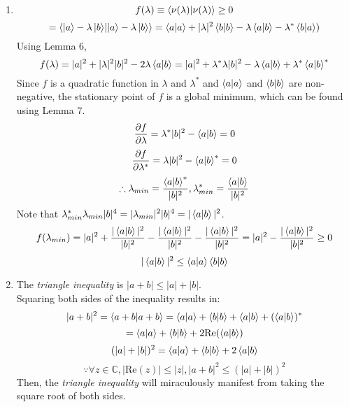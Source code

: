 \begin{sol}
\begin{enumerate}[label=\textbf{(\alph*)}]
\begin{proof}
$$\lim_{\epsilon\to 0} \frac{f(w+u\epsilon)-f(w)}{u\epsilon}=0$$ 
This limit is also the definition of $\displaystyle{\frac{\partial f}{\partial u}}$. 
\\
$$\text{Re}(z_0)\neq 0, \text{Im}(z_0)\neq 0\implies\forall z\in\mathbb{C}=\alpha z_0+\beta z_0^*, (\alpha,\beta)\in\mathbb{R}^2$$
$$\therefore\frac{\partial f}{\partial u}=\alpha\frac{\partial f}{\partial z_0}+\beta\frac{\partial f}{\partial z_0^*}=0$$ 
Define $w=u\epsilon$ and the defining condition for a stationary point of $f$ is satisfied. 
\end{proof}
\item
$$f(\lambda)\equiv\braket{\nu(\lambda)}{\nu(\lambda)}\geq 0$$
$$=\braket{\ket a-\lambda\ket b}{\ket a-\lambda\ket b}=\braket{a}{a}+|\lambda|^2\braket{b}{b}-\lambda\braket{a}{b}-\lambda^*\braket{b}{a})$$ 
Using Lemma 6, 
$$f(\lambda)=|a|^2+|\lambda|^2|b|^2-2\lambda\braket{a}{b}=|a|^2+\lambda^*\lambda|b|^2-\lambda\braket{a}{b}+\lambda^*\braket{a}{b}^*$$
Since $f$ is a quadratic function in $\lambda$ and $\lambda^*$ and $\braket{a}{a}$ and $\braket{b}{b}$ are non-negative, the stationary point of $f$ is a global minimum, which can be found using Lemma 7.
$$\frac{\partial f}{\partial\lambda}=\lambda^*|b|^2-\braket{a}{b}=0$$ 
$$\frac{\partial f}{\partial\lambda^*}=\lambda|b|^2-\braket{a}{b}^*=0$$ 
$$\therefore\lambda_{min}=\frac{\braket{a}{b}^*}{|b|^2},\lambda^*_{min}=\frac{\braket{a}{b}}{|b|^2}$$
Note that $\lambda_{min}^*\lambda_{min}|b|^4=|\lambda_{min}|^2|b|^4=|\braket{a}{b}|^2$.
$$f(\lambda_{min})=|a|^2+\frac{|\braket{a}{b}|^2}{|b|^2}-\frac{|\braket{a}{b}|^2}{|b|^2}-\frac{|\braket{a}{b}|^2}{|b|^2}=|a|^2-\frac{|\braket{a}{b}|^2}{|b|^2}\geq 0$$
$$|\braket{a}{b}|^2\leq\braket{a}{a}\braket{b}{b}$$ 
\item
The \textit{triangle inequality} is $|a+b|\leq|a|+|b|$.\\
Squaring both sides of the inequality results in:
$$|a+b|^2=\braket{a+b}{a+b}=\braket{a}{a}+\braket{b}{b}+\braket{a}{b}+(\braket{a}{b})^*$$
$$=\braket{a}{a}+\braket{b}{b}+2\text{Re}(\braket{a}{b})$$ 
$$(|a|+|b|)^2=\braket{a}{a}+\braket{b}{b}+2\braket{a}{b}$$
$$\because\forall z\in\mathbb C, |\text{Re}(z)|\leq|z|, |a+b|^2\leq(|a|+|b|)^2$$ 
Then, the \textit{triangle inequality} will miraculously manifest from taking the square root of both sides.
\end{enumerate}
\end{sol}